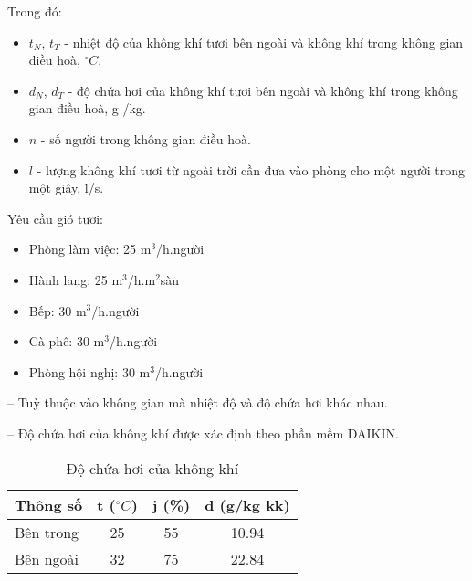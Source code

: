 Trong đó:
\begin{itemize}
	\item $t_{N}$, $t_{T}$ - nhiệt độ của không khí tươi bên ngoài và không khí trong không gian điều hoà, $^{\circ}C$.
	\item $d_{N}$, $d_{T}$ - độ chứa hơi của không khí tươi bên ngoài và không khí trong không gian điều hoà, g /kg.
	\item $ n $ - số người trong không gian điều hoà.
	\item $l$ - lượng không khí tươi từ ngoài trời cần đưa vào phòng cho một người trong một giây, l/s.
\end{itemize}

Yêu cầu gió tươi:
\begin{itemize}[label={-}]
	\item Phòng làm việc: 25 m$^3$/h.người
	\item Hành lang: 25 m$^3$/h.m$^2$sàn
	\item Bếp: 30 m$^3$/h.người
	\item Cà phê: 30 m$^3$/h.người
	\item Phòng hội nghị: 30 m$^3$/h.người
\end{itemize}

-- Tuỳ thuộc vào không gian mà nhiệt độ và độ chứa hơi khác nhau.

-- Độ chứa hơi của không khí được xác định theo phần mềm DAIKIN.

\begin{table}[H]
	\centering
	\caption{Độ chứa hơi của không khí}
	\begin{tabular}{|p{7.645em}|c|c|c|}
		\hline
		\textbf{Thông số} & \multicolumn{1}{p{5.43em}|}{\textbf{t ($^{\circ}C$)}} & \multicolumn{1}{p{4.645em}|}{\textbf{j (\%)}} & \multicolumn{1}{p{5.785em}|}{\textbf{d (g/kg kk)}} \bigstrut\\
		\hline
		Bên trong & 25       & 55       & 10.94 \bigstrut\\
		\hline
		Bên ngoài & 32       & 75       & 22.84 \bigstrut\\
		\hline
	\end{tabular}%
	\label{b:dch}%
\end{table}%

